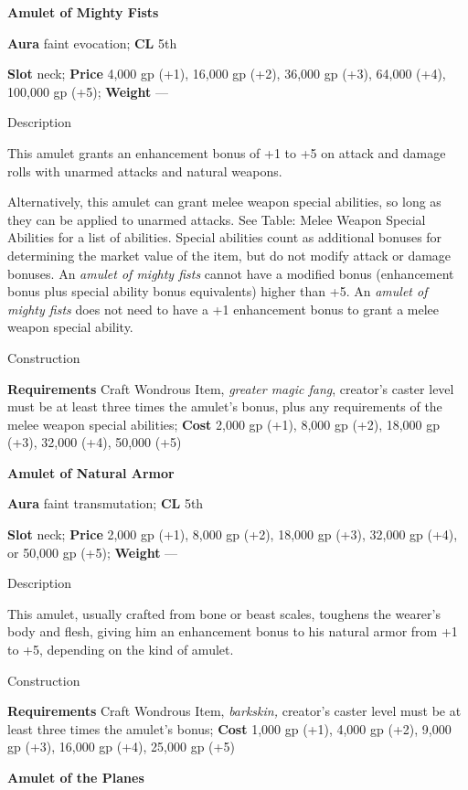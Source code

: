 \textbf{Amulet of Mighty Fists}
				
\textbf{Aura} faint evocation;\textbf{ CL }5th
				
\textbf{Slot} neck; \textbf{Price} 4,000 gp (+1), 16,000 gp (+2), 36,000 gp (+3), 64,000 (+4), 100,000 gp (+5); \textbf{Weight} ---
				
Description
				
This amulet grants an enhancement bonus of +1 to +5 on attack and damage rolls with unarmed attacks and natural weapons. 
				
Alternatively, this amulet can grant melee weapon special abilities, so long as they can be applied to unarmed attacks. See Table: Melee Weapon Special Abilities for a list of abilities. Special abilities count as additional bonuses for determining the market value of the item, but do not modify attack or damage bonuses. An \textit{amulet of mighty fists} cannot have a modified bonus (enhancement bonus plus special ability bonus equivalents) higher than +5. An \textit{amulet of mighty fists} does not need to have a +1 enhancement bonus to grant a melee weapon special ability.
				
Construction
				
\textbf{Requirements} Craft Wondrous Item, \textit{greater magic fang}, creator's caster level must be at least three times the amulet's bonus, plus any requirements of the melee weapon special abilities; \textbf{Cost} 2,000 gp (+1), 8,000 gp (+2), 18,000 gp (+3), 32,000 (+4), 50,000 (+5)
				
\textbf{Amulet of Natural Armor}
				
\textbf{Aura} faint transmutation;\textbf{ CL }5th
				
\textbf{Slot} neck; \textbf{Price} 2,000 gp (+1), 8,000 gp (+2), 18,000 gp (+3), 32,000 gp (+4), or 50,000 gp (+5); \textbf{Weight} ---
				
Description
				
This amulet, usually crafted from bone or beast scales, toughens the wearer's body and flesh, giving him an enhancement bonus to his natural armor from +1 to +5, depending on the kind of amulet. 
				
Construction
				
\textbf{Requirements} Craft Wondrous Item, \textit{barkskin,} creator's caster level must be at least three times the amulet's bonus; \textbf{Cost }1,000 gp (+1), 4,000 gp (+2), 9,000 gp (+3), 16,000 gp (+4), 25,000 gp (+5)
				
\textbf{Amulet of the Planes}
				
